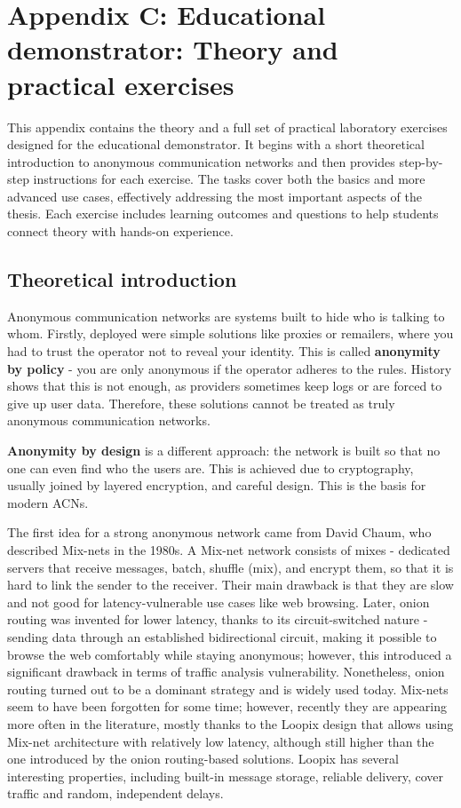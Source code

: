 \chapter*{Appendix C: Educational demonstrator: Theory and practical exercises}
\label{chap:AppendixC}

This appendix contains the theory and a full set of practical laboratory exercises designed for the educational demonstrator. It begins with a short theoretical introduction to anonymous communication networks and then provides step-by-step instructions for each exercise. The tasks cover both the basics and more advanced use cases, effectively addressing the most important aspects of the thesis. Each exercise includes learning outcomes and questions to help students connect theory with hands-on experience.

\section*{Theoretical introduction}
Anonymous communication networks are systems built to hide who is talking to whom. Firstly, deployed were simple solutions like proxies or remailers, where you had to trust the operator not to reveal your identity. This is called \textbf{anonymity by policy} - you are only anonymous if the operator adheres to the rules. History shows that this is not enough, as providers sometimes keep logs or are forced to give up user data. Therefore, these solutions cannot be treated as truly anonymous communication networks.

\textbf{Anonymity by design} is a different approach: the network is built so that no one can even find who the users are. This is achieved due to cryptography, usually joined by layered encryption, and careful design. This is the basis for modern ACNs.

The first idea for a strong anonymous network came from David Chaum, who described Mix-nets in the 1980s. A Mix-net network consists of mixes - dedicated servers that receive messages, batch, shuffle (mix), and encrypt them, so that it is hard to link the sender to the receiver. Their main drawback is that they are slow and not good for latency-vulnerable use cases like web browsing. Later, onion routing was invented for lower latency, thanks to its circuit-switched nature - sending data through an established bidirectional circuit, making it possible to browse the web comfortably while staying anonymous; however, this introduced a significant drawback in terms of traffic analysis vulnerability. Nonetheless, onion routing turned out to be a dominant strategy and is widely used today. Mix-nets seem to have been forgotten for some time; however, recently they are appearing more often in the literature, mostly thanks to the Loopix design that allows using Mix-net architecture with relatively low latency, although still higher than the one introduced by the onion routing-based solutions. Loopix has several interesting properties, including built-in message storage, reliable delivery, cover traffic and random, independent delays.

